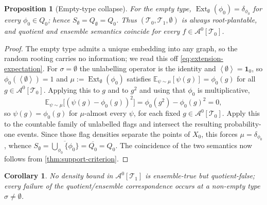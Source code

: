 \documentclass[11pt]{article}
\newtheorem{proposition}[proposition]{Proposition}
\newtheorem{corollary}[corollary]{Corollary}
\theoremstyle{definition}
\newcommand{\E}{\mathbb{E}}
\newcommand{\A}{\mathcal{A}}
\newcommand{\T}{\mathcal{T}}
\newcommand{\Ext}{\operatorname{Ext}}
\newcommand{\brak}[1]{\left\langle #1\right\rangle}
\newcommand{\one}{\mathbf 1}
\begin{document}
\begin{proposition}[Empty-type collapse]\label{prop:empty-type}
For the empty type, $\Ext_\emptyset(\phi_0)=\delta_{\phi_0}$ for every $\phi_0\in Q_0$;
hence $S_\emptyset=Q_\emptyset=Q_0$.  Thus $(\T_0,\T_1,\emptyset)$ is always
root-plantable, and quotient and ensemble semantics coincide for every $f\in\A^0[\T_0]$.
\end{proposition}

\begin{proof}
The empty type admits a unique embedding into any graph, so the random rooting carries
no information; we read this off \eqref{eq:extension-expectation}.  For
$\sigma=\emptyset$ the unlabelling operator is the identity and $\brak\emptyset=\one_0$, so
$\phi_0(\brak\emptyset)=1$ and $\mu:=\Ext_\emptyset(\phi_0)$ satisfies
$\E_{\psi\sim\mu}[\psi(g)]=\phi_0(g)$ for all $g\in\A^0[\T_0]$.  Applying this to $g$ and to
$g^2$ and using that $\phi_0$ is multiplicative,
\[
  \E_{\psi\sim\mu}\bigl[(\psi(g)-\phi_0(g))^2\bigr]=\phi_0(g^2)-\phi_0(g)^2=0,
\]
so $\psi(g)=\phi_0(g)$ for $\mu$-almost every $\psi$, for each fixed $g\in\A^0[\T_0]$.
Apply this to the countable family of unlabelled flags and intersect the resulting
probability-one events.  Since those flag densities separate the points of $X_0$, this
forces $\mu=\delta_{\phi_0}$, whence
$S_\emptyset=\overline{\bigcup_{\phi_0}\{\phi_0\}}=\overline{Q_0}=Q_0$.  The coincidence
of the two semantics now follows from \cref{thm:support-criterion}.
\end{proof}

\begin{corollary}\label{cor:confined}
No density bound in $\A^0[\T_1]$ is ensemble-true but quotient-false; every failure of
the quotient/ensemble correspondence occurs at a non-empty type $\sigma\ne\emptyset$.  
\end{corollary}
\end{document}
